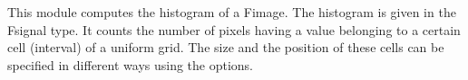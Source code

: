 This module computes the histogram of a Fimage.
The histogram is given in the Fsignal type.
It counts the number of pixels having a value belonging to a certain
cell (interval) of a uniform grid.
The size and the position of these cells can be specified in different
ways using the options.




